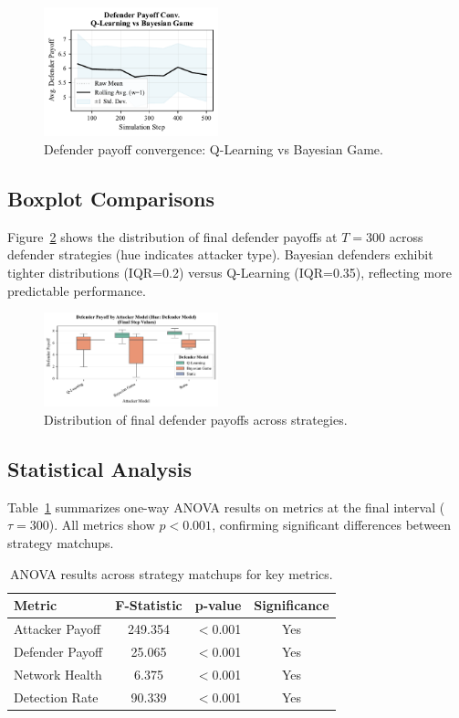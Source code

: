 \documentclass[conference]{IEEEtran}
\begin{document}
\begin{figure}[htbp]
  \centering
  \includegraphics[width=0.45\textwidth]{fig_def_convergence.pdf}
  \caption{Defender payoff convergence: Q-Learning vs Bayesian Game.}
  \label{fig:conv_db}
\end{figure}

\subsection{Boxplot Comparisons}
Figure~\ref{fig:def_box} shows the distribution of final defender payoffs at $T=300$ across defender strategies (hue indicates attacker type). Bayesian defenders exhibit tighter distributions (IQR=0.2) versus Q-Learning (IQR=0.35), reflecting more predictable performance.

\begin{figure}[htbp]
  \centering
  \includegraphics[width=0.45\textwidth]{fig_def_payoff_boxplot.pdf}
  \caption{Distribution of final defender payoffs across strategies.}
  \label{fig:def_box}   
\end{figure}

\subsection{Statistical Analysis}
Table~\ref{tab:anova} summarizes one-way ANOVA results on metrics at the final interval ($\tau=300$). All metrics show $p<0.001$, confirming significant differences between strategy matchups.

\begin{table}[htbp]
  \centering
  \caption{ANOVA results across strategy matchups for key metrics.}
  \label{tab:anova}
  \begin{tabular}{lccc}
    \toprule
    \textbf{Metric} & \textbf{F-Statistic} & \textbf{p-value} & \textbf{Significance} \\
    \midrule
    Attacker Payoff & 249.354 & $<$0.001 & Yes \\
    Defender Payoff & 25.065 & $<$0.001 & Yes \\
    Network Health   & 6.375  & $<$0.001 & Yes \\
    Detection Rate   & 90.339 & $<$0.001 & Yes \\
    \bottomrule
  \end{tabular}
\end{table}
\end{document}
